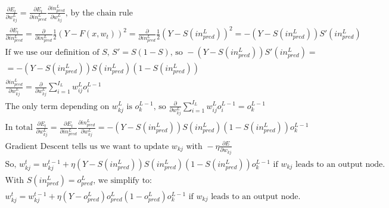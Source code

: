 \documentclass[11pt]{article}
\begin{document}
\begin{gather*}
\frac{\partial E_{t}}{\partial w_{kj}^{L}} = 
\frac{\partial E_{t}}{\partial in_{pred}^{L}} 
\frac{\partial in_{pred}^{L}}{\partial w_{kj}^{L}}
\text{, by the chain rule}\\
\frac{\partial E_{t}}{\partial in_{pred}^{L}} = 
\frac{\partial}{\partial in_{pred}^{L}} \frac{1}{2} (Y - F(x, w_{t}))^{2} = 
\frac{\partial}{\partial in_{pred}^{L}} \frac{1}{2} (Y - S(in_{pred}^{L}))^{2} = 
- (Y - S(in_{pred}^{L})) S'(in_{pred}^{L})\\
\text{If we use our definition of } S \text{, } S' = S (1 - S) \text{, so } 
- (Y - S(in_{pred}^{L})) S'(in_{pred}^{L}) = \\
= - (Y - S(in_{pred}^{L})) S(in_{pred}^{L}) (1 - S(in_{pred}^{L}))\\
\frac{\partial in_{pred}^{L}}{\partial w_{kj}^{L}} = 
\frac{\partial}{\partial w_{kj}^{L}} 
\sum_{i = 1}^{I_{L}} w_{ij}^{L} o_{i}^{L - 1}\\
\text{The only term depending on } w_{kj}^{L} \text{ is } o_{k}^{L - 1} 
\text{, so } 
\frac{\partial}{\partial w_{kj}^{L}} 
\sum_{i = 1}^{I_{L}} w_{ij}^{L} o_{i}^{L - 1} = 
o_{k}^{L - 1}\\
\text{In total } 
\frac{\partial E_{t}}{\partial w_{kj}^{L}} = 
\frac{\partial E_{t}}{\partial in_{pred}^{L}} 
\frac{\partial in_{pred}^{L}}{\partial w_{kj}^{L}} = 
- (Y - S(in_{pred}^{L})) S(in_{pred}^{L}) (1 - S(in_{pred}^{L})) o_{k}^{L - 1}\\
\text{Gradient Descent tells us we want to update } w_{kj} \text{ with } 
- \eta \frac{\partial E}{\partial w_{kj}}\\
\text{So, } w_{kj}^{t} = w_{kj}^{t - 1} + 
\eta (Y - S(in_{pred}^{L})) S(in_{pred}^{L}) (1 - S(in_{pred}^{L})) o_{k}^{L - 1} 
\text{ if } w_{kj} \text{ leads to an output node.}\\
\text{With } S(in_{pred}^{L}) = o_{pred}^{L} \text{, we simplify to:}\\
w_{kj}^{t} = w_{kj}^{t - 1} + 
\eta (Y - o_{pred}^{L}) o_{pred}^{L} (1 - o_{pred}^{L}) o_{k}^{L - 1} 
\text{ if } w_{kj} \text{ leads to an output node.}
\end{gather*}
\end{document}

